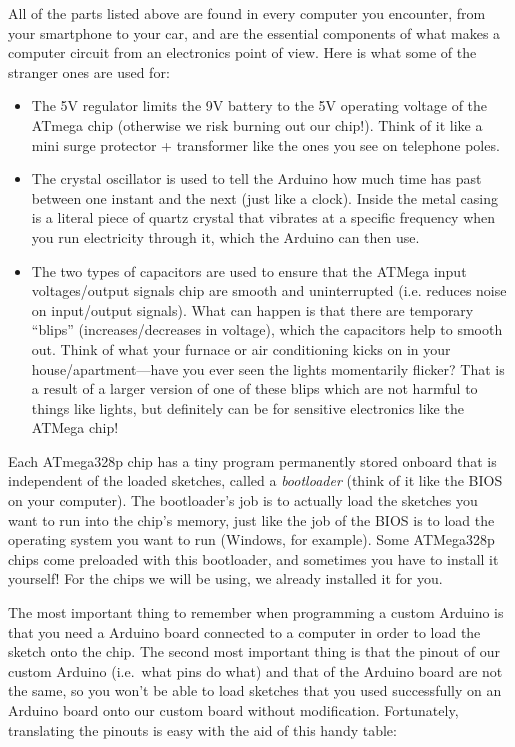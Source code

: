 \documentclass[11pt]{article}
\begin{document}
All of the parts listed above are found in every computer you encounter, from your
smartphone to your car, and are the essential components of what makes a computer
circuit from an electronics point of view. Here is what some of the stranger ones are
used for:

\begin{itemize}
\item {The 5V regulator limits the 9V battery to the 5V operating voltage of the
    ATmega chip (otherwise we risk burning out our chip!). Think of it like a mini
    surge protector + transformer like the ones you see on telephone poles.}
\item {The crystal oscillator is used to tell the Arduino how much time has past
    between one instant and the next (just like a clock). Inside the metal casing is
    a literal piece of quartz crystal that vibrates at a specific frequency when you
    run electricity through it, which the Arduino can then use.}
\item {The two types of capacitors are used to ensure that the ATMega input
    voltages/output signals chip are smooth and uninterrupted (i.e. reduces noise on
    input/output signals). What can happen is that there are temporary ``blips''
    (increases/decreases in voltage), which the capacitors help to smooth out. Think
    of what your furnace or air conditioning kicks on in your house/apartment---have
    you ever seen the lights momentarily flicker? That is a result of a larger
    version of one of these blips which are not harmful to things like lights, but
    definitely can be for sensitive electronics like the ATMega chip!}
\end{itemize}

Each ATmega328p chip has a tiny program permanently stored onboard that is
independent of the loaded sketches, called a \emph{bootloader} (think of it like the
BIOS on your computer). The bootloader's job is to actually load the sketches you
want to run into the chip's memory, just like the job of the BIOS is to load the
operating system you want to run (Windows, for example). Some ATMega328p chips come
preloaded with this bootloader, and sometimes you have to install it yourself! For
the chips we will be using, we already installed it for you.

The most important thing to remember when programming a custom Arduino is that you
need a Arduino board connected to a computer in order to load the sketch onto the
chip. The second most important thing is that the pinout of our custom Arduino
(i.e.~what pins do what) and that of the Arduino board are not the same, so you won't
be able to load sketches that you used successfully on an Arduino board onto our
custom board without modification. Fortunately, translating the pinouts is easy with
the aid of this handy table:
\end{document}
